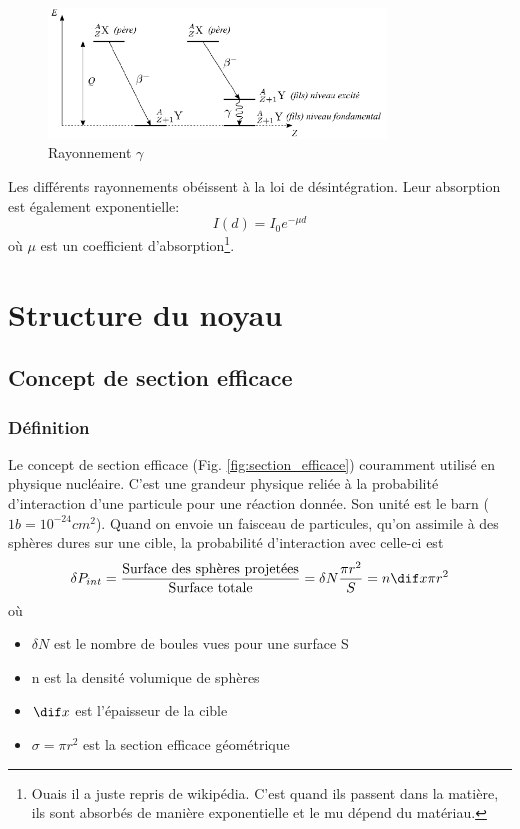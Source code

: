 \begin{figure}[ht]
    \centering
    \includegraphics[width=0.8\textwidth]{Images1/gamma.PNG}
    \caption{Rayonnement $\gamma$}
    \label{fig:rayons_gamma}
\end{figure}
Les différents rayonnements obéissent à la loi de désintégration. Leur absorption est également exponentielle:
\[
    I(d)=I_0e^{-\mu d}
\]
où $\mu$ est un coefficient d'absorption\footnote{Ouais il a juste repris de wikipédia. C'est quand ils passent dans la matière, ils sont absorbés de manière exponentielle et le mu dépend du matériau.}.


\section{Structure du noyau}
\subsection{Concept de section efficace}\label{sec:section_efficace}
\subsubsection{Définition}
Le concept de section efficace (Fig. \ref{fig:section_efficace}) couramment utilisé en physique nucléaire. C'est une grandeur physique reliée à la probabilité d'interaction d'une particule pour une réaction donnée. Son unité est le barn ($1b=10^{-24}cm^2$).
Quand on envoie un faisceau de particules, qu'on assimile à des sphères dures sur une cible, la probabilité d'interaction avec celle-ci est
\[
    \delta P_{int}=\dfrac{\text{Surface des sphères projetées}}{\text{Surface totale}}=\delta N \dfrac{\pi r^2}{S}=n \dif x \pi r^2
\]
où
\begin{itemize}
    \item $\delta N$ est le nombre de boules vues pour une surface S
    \item n est la densité volumique de sphères
    \item $\dif x$ est l'épaisseur de la cible
    \item $\sigma=\pi r^2$ est la section efficace géométrique
\end{itemize}

